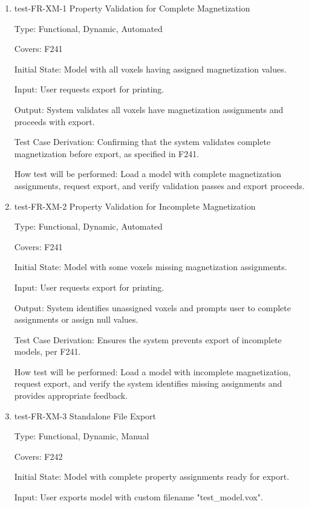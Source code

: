 \documentclass[12pt, titlepage]{article}
\begin{document}
\begin{enumerate}

\item{test-FR-XM-1 Property Validation for Complete Magnetization\\}

Type: Functional, Dynamic, Automated

Covers: F241
					
Initial State: Model with all voxels having assigned magnetization values.
					
Input: User requests export for printing.
					
Output: System validates all voxels have magnetization assignments and proceeds with export.

Test Case Derivation: Confirming that the system validates complete magnetization before export, as specified in F241.
					
How test will be performed: Load a model with complete magnetization assignments, request export, and verify validation passes and export proceeds.

\item{test-FR-XM-2 Property Validation for Incomplete Magnetization\\}

Type: Functional, Dynamic, Automated

Covers: F241
					
Initial State: Model with some voxels missing magnetization assignments.
					
Input: User requests export for printing.
					
Output: System identifies unassigned voxels and prompts user to complete assignments or assign null values.

Test Case Derivation: Ensures the system prevents export of incomplete models, per F241.
					
How test will be performed: Load a model with incomplete magnetization, request export, and verify the system identifies missing assignments and provides appropriate feedback.

\item{test-FR-XM-3 Standalone File Export\\}

Type: Functional, Dynamic, Manual

Covers: F242
					
Initial State: Model with complete property assignments ready for export.
					
Input: User exports model with custom filename "test\_model.vox".
					

\end{enumerate}
\end{document}
